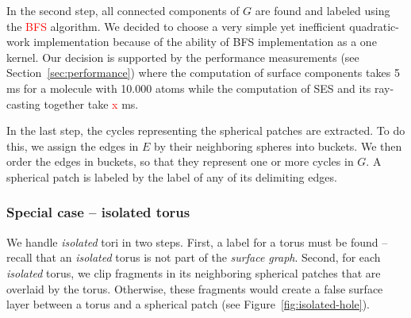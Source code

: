 In the second step, all connected components of $G$ are found and labeled using the \textcolor{red}{BFS} algorithm.
We decided to choose a very simple yet inefficient \cite{merrill2012scalable} quadratic-work implementation because of the ability of BFS implementation as a one kernel.
Our decision is supported by the performance measurements (see Section~\ref{sec:performance}) where the computation of surface components takes {\tweakedsim}5 ms for a molecule with {\tweakedsim}10.000 atoms while the computation of SES and its ray-casting together take {\tweakedsim}\textcolor{red}{x} ms.

In the last step, the cycles representing the spherical patches are extracted.
To do this, we assign the edges in $E$ by their neighboring spheres into buckets.
We then order the edges in buckets, so that they represent one or more cycles in $G$.
A spherical patch is labeled by the label of any of its delimiting edges.

\subsubsection{Special case -- isolated torus}
\label{sec:isolated}

We handle \textit{isolated} tori in two steps.
First, a label for a torus must be found -- recall that an \textit{isolated} torus is not part of the \textit{surface graph}.
Second, for each \textit{isolated} torus, we clip fragments in its neighboring spherical patches that are overlaid by the torus. Otherwise, these fragments would create a false surface layer between a torus and a spherical patch (see Figure~\ref{fig:isolated-hole}).

